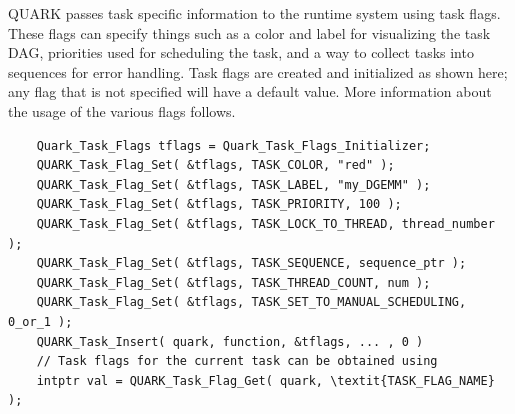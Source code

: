 \documentclass[11pt,letterpaper]{report}
\begin{document}
QUARK passes task specific information to the runtime system using
task flags.  These flags can specify things such as a color and label
for visualizing the task DAG, priorities used for scheduling the task,
and a way to collect tasks into sequences for error handling.  Task
flags are created and initialized as shown here; any flag that is not
specified will have a default value.  More information about the usage
of the various flags follows.
\pagebreak[3]
\begin{samepage}
\begin{lstlisting}
    Quark_Task_Flags tflags = Quark_Task_Flags_Initializer;
    QUARK_Task_Flag_Set( &tflags, TASK_COLOR, "red" );
    QUARK_Task_Flag_Set( &tflags, TASK_LABEL, "my_DGEMM" );
    QUARK_Task_Flag_Set( &tflags, TASK_PRIORITY, 100 );
    QUARK_Task_Flag_Set( &tflags, TASK_LOCK_TO_THREAD, thread_number );
    QUARK_Task_Flag_Set( &tflags, TASK_SEQUENCE, sequence_ptr );
    QUARK_Task_Flag_Set( &tflags, TASK_THREAD_COUNT, num );
    QUARK_Task_Flag_Set( &tflags, TASK_SET_TO_MANUAL_SCHEDULING, 0_or_1 );
    QUARK_Task_Insert( quark, function, &tflags, ... , 0 )
    // Task flags for the current task can be obtained using
    intptr val = QUARK_Task_Flag_Get( quark, \textit{TASK_FLAG_NAME} );
\end{lstlisting}
\end{samepage}
\pagebreak[3]
\end{document}
